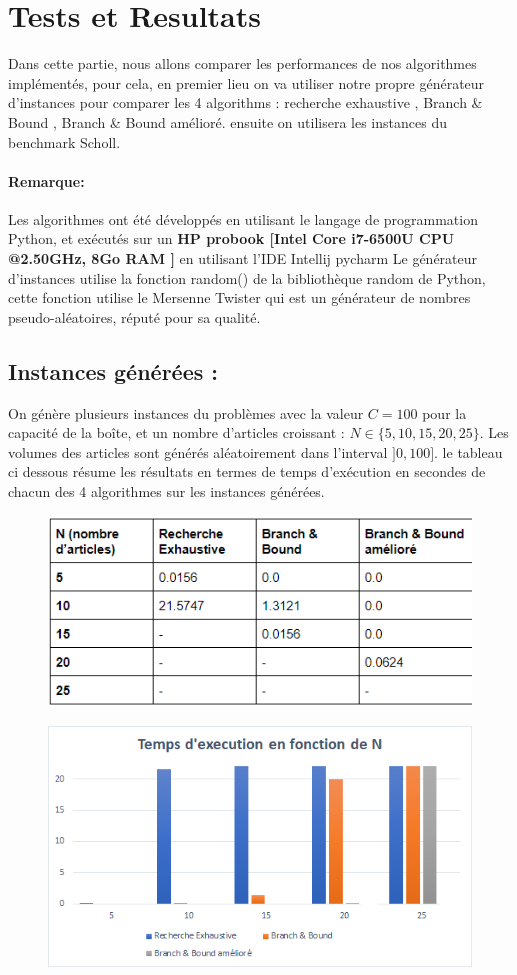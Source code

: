 \documentclass[12pt]{article}
\begin{document}
\section{Tests et Resultats}
Dans cette partie, nous allons comparer les performances de nos algorithmes implémentés, pour cela, en premier lieu on va utiliser notre propre générateur d’instances pour comparer les 4 algorithms : recherche exhaustive , Branch \& Bound , Branch \& Bound amélioré. ensuite on utilisera les instances du benchmark Scholl. 
\paragraph*{Remarque: } Les algorithmes ont été développés en utilisant le langage de programmation Python, et exécutés sur un \textbf{HP probook [Intel Core i7-6500U CPU @2.50GHz, 8Go RAM ]} en utilisant l'IDE Intellij pycharm
Le générateur d’instances utilise la fonction random() de la bibliothèque random de Python, cette fonction utilise le Mersenne Twister qui est un générateur de nombres pseudo-aléatoires, réputé pour sa qualité.
\subsection{Instances générées : }
On génère plusieurs instances du problèmes avec la valeur \(C=100\) pour la capacité de la boîte, et un nombre d’articles croissant : \( N \in \{5,10,15,20,25\}\). Les volumes des articles sont générés aléatoirement dans l’interval \(]0,100]\). le tableau ci dessous résume les résultats en termes de temps d'exécution en secondes de chacun des 4 algorithmes sur les instances générées. 
\begin{figure}[H]
    \includegraphics[width=13.5cm]{../figures/tab1.png}
\end{figure}
\begin{figure}[H]
    \includegraphics[width=13.5cm]{../figures/graph1.png}
\end{figure}
\end{document}
